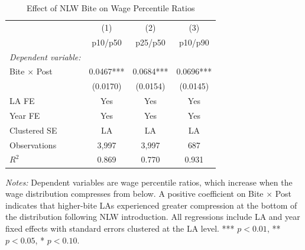 \begin{table}[htbp]
\centering
\caption{Effect of NLW Bite on Wage Percentile Ratios}
\label{tab:ratios}
\small
\begin{tabular}{lccc}
\hline\hline
 & (1) & (2) & (3) \\
 & p10/p50 & p25/p50 & p10/p90 \\
\hline
\textit{Dependent variable:} & & & \\
Bite $\times$ Post  & 0.0467*** & 0.0684*** & 0.0696*** \\
 & (0.0170) & (0.0154) & (0.0145) \\
\hline
LA FE        & Yes & Yes & Yes \\
Year FE      & Yes & Yes & Yes \\
Clustered SE & LA  & LA  & LA  \\
Observations    & 3,997 & 3,997 & 687 \\
$R^2$           & 0.869 & 0.770 & 0.931 \\
\hline\hline
\end{tabular}
\raggedright\footnotesize\textit{Notes:} Dependent variables are wage percentile ratios, which increase when the wage distribution compresses from below. A positive coefficient on Bite $\times$ Post indicates that higher-bite LAs experienced greater compression at the bottom of the distribution following NLW introduction. All regressions include LA and year fixed effects with standard errors clustered at the LA level. *** $p<0.01$, ** $p<0.05$, * $p<0.10$.
\end{table}
